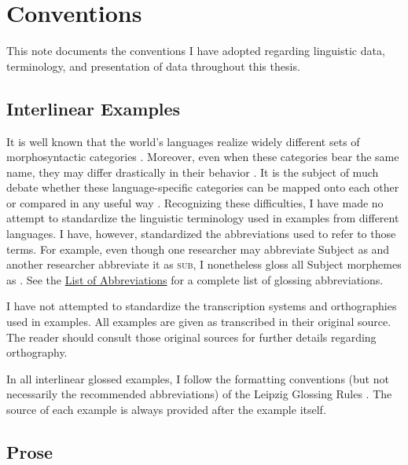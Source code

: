 \section*{Conventions}
\label{sec:conventions}

This note documents the conventions I have adopted regarding linguistic data, terminology, and presentation of data throughout this thesis.

\subsection*{Interlinear Examples}

It is well known that the world's languages realize widely different sets of morphosyntactic categories \parencites[58]{Whaley1997}{Haspelmath2007}. Moreover, even when these categories bear the same name, they may differ drastically in their behavior \parencite[9]{Dixon2010}. It is the subject of much debate whether these language-specific categories can be mapped onto each other or compared in any useful way \parencites{Croft1995}[10--15]{Song2001}[13--19]{Croft2003}{Haspelmath2010a}{Haspelmath2010c}{Newmeyer2010}{Stassen2011}[308--310]{Hieber2013}{Croft2014}{Plank2016}[44--58]{Song2018}. Recognizing these difficulties, I have made no attempt to standardize the linguistic terminology used in examples from different languages. I have, however, standardized the abbreviations used to refer to those terms. For example, even though one researcher may abbreviate Subject as  and another researcher abbreviate it as \textsc{sub}, I nonetheless gloss all Subject morphemes as . See the \hyperref[ch:abbreviations]{List of Abbreviations} for a complete list of glossing abbreviations.

I have not attempted to standardize the transcription systems and orthographies used in examples. All examples are given as transcribed in their original source. The reader should consult those original sources for further details regarding orthography.

In all interlinear glossed examples, I follow the formatting conventions (but not necessarily the recommended abbreviations) of the Leipzig Glossing Rules \parencite{BickelComrieHaspelmath2015}. The source of each example is always provided after the example itself.

\subsection*{Prose}

